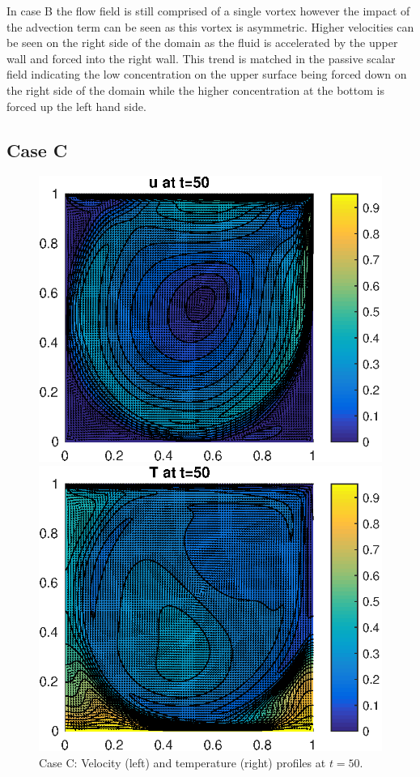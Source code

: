 \documentclass[10pt,a4paper]{article}
\begin{document}
In case B the flow field is still comprised of a single vortex however the impact of the advection term can be seen as this vortex is asymmetric. Higher velocities can be seen on the right side of the domain as the fluid is accelerated by the upper wall and forced into the right wall. This trend is matched in the passive scalar field indicating the low concentration on the upper surface being forced down on the right side of the domain while the higher concentration at the bottom is forced up the left hand side.

\subsection{Case C}

\begin{figure}[H]
\centering
\begin{minipage}{.5\textwidth}
  \centering
  \includegraphics[width=.9\linewidth]{Part1_Case_C_Velocity.eps}
\end{minipage}%
\begin{minipage}{.5\textwidth}
  \centering
  \includegraphics[width=.9\linewidth]{Part1_Case_C_Temp.eps}
\end{minipage}
\caption{Case C: Velocity (left) and temperature (right) profiles at $t = 50$.}
\label{fig:1C}
\end{figure}
\end{document}
